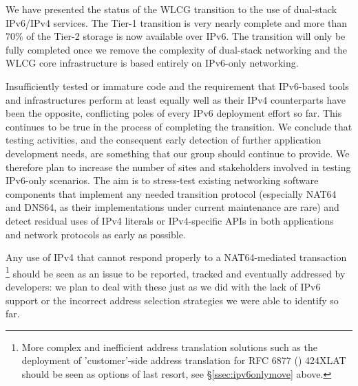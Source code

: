 
We have presented the status of the WLCG transition to the use of dual-stack IPv6/IPv4 services. The Tier-1 transition is very nearly complete and 
more than 70\% of the Tier-2 storage is now available over IPv6. The transition will only be fully completed once we remove the complexity of
dual-stack networking and the WLCG core infrastructure is based entirely on IPv6-only networking.


Insufficiently tested or immature code and the requirement that IPv6-based
tools and infrastructures perform at least equally well as their IPv4
counterparts have been the opposite, conflicting poles of every IPv6
deployment effort so far. This continues to be true in the process
of completing the transition. We conclude that
testing activities, and the consequent early detection of further application
development needs, are something that our group should continue to provide. We therefore plan
to increase the number of sites and stakeholders involved in testing IPv6-only 
scenarios. The aim is to stress-test existing networking software components
that implement any needed transition protocol (especially NAT64 and DNS64, as 
their implementations under current maintenance are rare) and detect
residual uses of IPv4 literals or IPv4-specific APIs in both applications and
network protocols as early as possible.\par
Any use of IPv4 that cannot respond properly to a NAT64-mediated
transaction
\footnote{More complex and inefficient address
translation solutions such as the deployment of 'customer'-side address
translation for RFC 6877 (\cite{rfc}) 424XLAT should be
seen as options of last resort, see \S \ref{ssec:ipv6onlymove} above.}
should be seen as an issue to be reported, tracked and eventually
addressed by developers: we plan to deal with these just as we did
with the lack of IPv6 support or the incorrect address selection
strategies we were able to identify so far.
